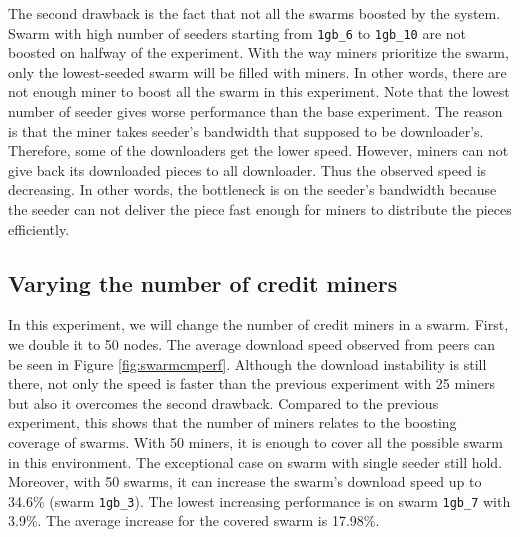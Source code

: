 The second drawback is the fact that not all the swarms boosted by the system. Swarm with high number of seeders starting from \texttt{1gb\_6} to \texttt{1gb\_10} are not boosted on halfway of the experiment. With the way miners prioritize the swarm, only the lowest-seeded swarm will be filled with miners. In other words, there are not enough miner to boost all the swarm in this experiment. Note that the lowest number of seeder gives worse performance than the base experiment. The reason is that the miner takes seeder's bandwidth that supposed to be downloader's. Therefore, some of the downloaders get the lower speed. However, miners can not give back its downloaded pieces to all downloader. Thus the observed speed is decreasing. In other words, the bottleneck is on the seeder's bandwidth because the seeder can not deliver the piece fast enough for miners to distribute the pieces efficiently.

\subsection{Varying the number of credit miners}
In this experiment, we will change the number of credit miners in a swarm. First, we double it to 50 nodes. The average download speed observed from peers can be seen in Figure \ref{fig:swarmcmperf}. Although the download instability is still there, not only the speed is faster than the previous experiment with 25 miners but also it overcomes the second drawback. Compared to the previous experiment, this shows that the number of miners relates to the boosting coverage of swarms. With 50 miners, it is enough to cover all the possible swarm in this environment. The exceptional case on swarm with single seeder still hold. Moreover, with 50 swarms, it can increase the swarm's download speed up to 34.6\% (swarm \texttt{1gb\_3}). The lowest increasing performance is on swarm \texttt{1gb\_7} with 3.9\%. The average increase for the covered swarm is 17.98\%.

